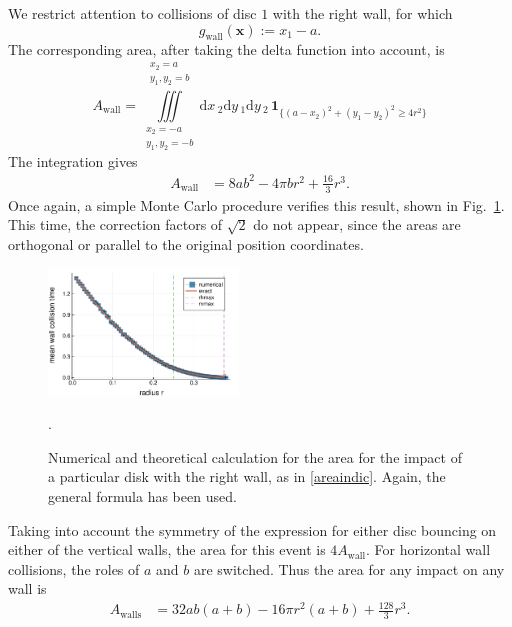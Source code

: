 \documentclass[superscriptaddress,pre,reprint,showpacs,twocolumn]{revtex4-1}
\newcommand{\rd}[1]{\mathrm{d}{#1} \,}
\newcommand{\indicatorsymbol}{\mathbf{1}}
\newcommand{\indicator}[1]{\indicatorsymbol_{ \{   #1 \} } }
\begin{document}
We restrict attention to collisions of disc $1$ with the right wall, for which
$$g_\text{wall}(\mathbf{x}) := x_1 - a.$$
The corresponding area, after taking the delta function into account, is
\begin{equation}\label{areaindic}
  A_\mathrm{wall} =  \iiint \limits_ {\substack{x_2 = -a \\ y_1, y_2 = -b }}^
  {\substack{x_2=a\\ y_1,y_2=b}} 
   \rd x_2   \rd y_1   \rd y_2 \, \indicator{ (a-x_2)^2 + (y_1-y_2)^2 \ge 4 r^2 }
\end{equation}
The integration gives
\begin{align}\label{areax1p}
 A_\mathrm{wall} & = 8 a b^2-4  \pi b r^2 +\frac{16}{3}r^3 .
\end{align}
Once again, a simple Monte Carlo procedure verifies this result,
shown in Fig.~\ref{area1derecha}. 
This time, the correction factors of $\sqrt{2}$ do not appear, since
the areas are orthogonal or parallel to the original
position coordinates.


\begin{figure}
\centering
\includegraphics[width=0.45\textwidth]{./figures/AreaWall01.pdf}
\caption{Numerical and theoretical calculation for the area
for the impact of a particular disk with the right wall, as in \eqref{areaindic}.
Again, the general formula has been used.}
\label{area1derecha}.
\end{figure}

Taking into account the symmetry of the expression for either disc
 bouncing on either of the vertical walls, the
area for this event is  $4A_\text{wall}$. For horizontal wall 
collisions, the roles of $a$ and $b$ are switched.
Thus the area for any impact on any wall is
\begin{align}\label{areawalls}
 A_\text{walls} & = 32 a b (a+b)-16 \pi r^2 (a+b) +\frac{128}{3}r^3.
\end{align}
\end{document}
